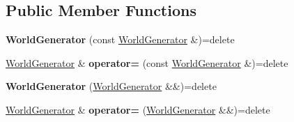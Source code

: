 \subsection*{Public Member Functions}
\begin{DoxyCompactItemize}
\item 
\hypertarget{class_student_1_1_world_generator_ad392b5158b81af13c8cb49eeb2d46488}{{\bfseries World\-Generator} (const \hyperlink{class_student_1_1_world_generator}{World\-Generator} \&)=delete}\label{class_student_1_1_world_generator_ad392b5158b81af13c8cb49eeb2d46488}

\item 
\hypertarget{class_student_1_1_world_generator_a4c896785136a6fdeea5fe725d19586d8}{\hyperlink{class_student_1_1_world_generator}{World\-Generator} \& {\bfseries operator=} (const \hyperlink{class_student_1_1_world_generator}{World\-Generator} \&)=delete}\label{class_student_1_1_world_generator_a4c896785136a6fdeea5fe725d19586d8}

\item 
\hypertarget{class_student_1_1_world_generator_ad9ccb5edd8f485c739dc45ce356d4448}{{\bfseries World\-Generator} (\hyperlink{class_student_1_1_world_generator}{World\-Generator} \&\&)=delete}\label{class_student_1_1_world_generator_ad9ccb5edd8f485c739dc45ce356d4448}

\item 
\hypertarget{class_student_1_1_world_generator_a478f9a64d622acfffbd8f5762f3911f2}{\hyperlink{class_student_1_1_world_generator}{World\-Generator} \& {\bfseries operator=} (\hyperlink{class_student_1_1_world_generator}{World\-Generator} \&\&)=delete}\label{class_student_1_1_world_generator_a478f9a64d622acfffbd8f5762f3911f2}


\end{DoxyCompactItemize}
